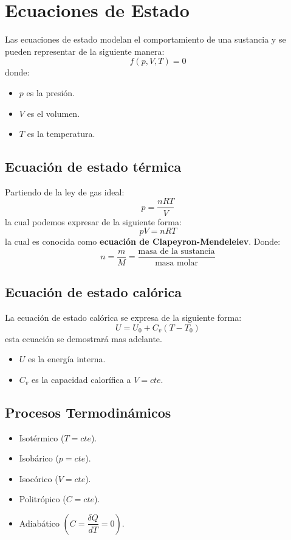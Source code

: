 \documentclass[../main]{subfiles}
\begin{document}
\chapter{Ecuaciones de Estado}
Las ecuaciones de estado modelan el comportamiento de una sustancia y se pueden representar de la siguiente manera:
\begin{equation}
    f(p,V,T)=0
\end{equation}
donde:
\begin{itemize}
    \item $p$ es la presión.
    \item $V$ es el volumen.
    \item $T$ es la temperatura.
\end{itemize}
\section{Ecuación de estado térmica}
Partiendo de la ley de gas ideal:
\begin{equation}
    p=\dfrac{n RT}{V}
\end{equation}
la cual podemos expresar de la siguiente forma:
\begin{equation}
    pV=nRT
\end{equation}
la cual es conocida como \textbf{ecuación de Clapeyron-Mendeleiev}. Donde:
\begin{equation}
    n=\dfrac{m}{M}=\dfrac{\text{masa de la sustancia}}{\text{masa molar}}
\end{equation}
\section{Ecuación de estado calórica}
La ecuación de estado calórica se expresa de la siguiente forma:
\begin{equation}
    U=U_0+C_v(T-T_0)
\end{equation}
esta ecuación se demostrará mas adelante.

\begin{itemize}
    \item $U$ es la energía interna.
    \item $C_v$ es la capacidad calorífica a $V=cte$.
\end{itemize}

\section*{Procesos Termodinámicos}

\begin{itemize}
    \item Isotérmico ($T=cte$).
    \item Isobárico ($p=cte$).
    \item Isocórico ($V=cte$).
    \item Politrópico ($C=cte$).
    \item Adiabático $\left(C=\dfrac{\delta Q}{dT}=0\right)$.
\end{itemize}
\end{document}

